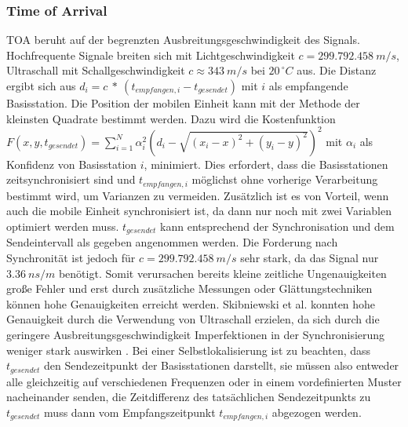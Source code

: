 \subsubsection{Time of Arrival}
TOA beruht auf der begrenzten Ausbreitungsgeschwindigkeit des Signals.
Hochfrequente Signale breiten sich mit Lichtgeschwindigkeit $c = 299.792.458\ m/s$, Ultraschall mit Schallgeschwindigkeit $c \approx 343\ m/s$ bei $20^{\ \circ}C$ aus.
Die Distanz ergibt sich aus $d_i = c\ *\ (t_{empfangen,i} - t_{gesendet})$ mit $i$ als empfangende Basisstation.
Die Position der mobilen Einheit kann mit der Methode der kleinsten Quadrate bestimmt werden.
Dazu wird die Kostenfunktion $F(x,y,t_{gesendet}) = \sum_{i=1}^{N} {\alpha}^2_i (d_i - \sqrt{(x_i - x)^2 + (y_i - y)^2})^2$ mit ${\alpha}_i$ als Konfidenz von Basisstation $i$, minimiert. Dies erfordert, dass die Basisstationen zeitsynchronisiert sind und $t_{empfangen,i}$ möglichst ohne vorherige Verarbeitung bestimmt wird, um Varianzen zu vermeiden.
Zusätzlich ist es von Vorteil, wenn auch die mobile Einheit synchronisiert ist, da dann nur noch mit zwei Variablen optimiert werden muss.
$t_{gesendet}$ kann entsprechend der Synchronisation und dem Sendeintervall als gegeben angenommen werden.
Die Forderung nach Synchronität ist jedoch für $c = 299.792.458\ m/s$ sehr stark, da das Signal nur $3.36\ ns/m$ benötigt.
Somit verursachen bereits kleine zeitliche Ungenauigkeiten große Fehler und erst durch zusätzliche Messungen oder Glättungstechniken können hohe Genauigkeiten erreicht werden.
Skibniewski et al. konnten hohe Genauigkeit durch die Verwendung von Ultraschall erzielen, da sich durch die geringere Ausbreitungsgeschwindigkeit Imperfektionen in der Synchronisierung weniger stark auswirken \cite{skibniewski2009simulation}.
Bei einer Selbstlokalisierung ist zu beachten, dass $t_{gesendet}$ den Sendezeitpunkt der Basisstationen darstellt, sie müssen also entweder alle gleichzeitig auf verschiedenen Frequenzen oder in einem vordefinierten Muster nacheinander senden, die Zeitdifferenz des tatsächlichen Sendezeitpunkts zu $t_{gesendet}$ muss dann vom Empfangszeitpunkt $t_{empfangen,i}$ abgezogen werden.


